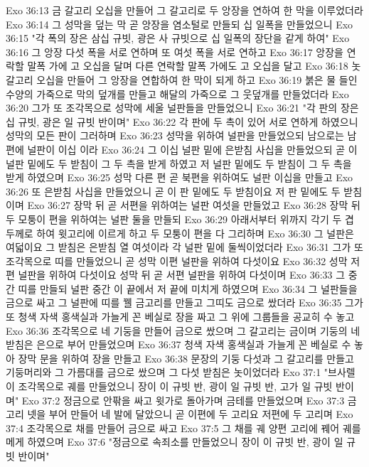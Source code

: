 Exo 36:13  금 갈고리 오십을 만들어 그 갈고리로 두 앙장을 연하여 한 막을 이루었더라
Exo 36:14  그 성막을 덮는 막 곧 앙장을 염소털로 만들되 십 일폭을 만들었으니
Exo 36:15  "각 폭의 장은 삼십 규빗, 광은 사 규빗으로 십 일폭의 장단을 같게 하여"
Exo 36:16  그 앙장 다섯 폭을 서로 연하며 또 여섯 폭을 서로 연하고
Exo 36:17  앙장을 연락할 말폭 가에 고 오십을 달며 다른 연락할 말폭 가에도 고 오십을 달고
Exo 36:18  놋 갈고리 오십을 만들어 그 앙장을 연합하여 한 막이 되게 하고
Exo 36:19  붉은 물 들인 수양의 가죽으로 막의 덮개를 만들고 해달의 가죽으로 그 웃덮개를 만들었더라
Exo 36:20  그가 또 조각목으로 성막에 세울 널판들을 만들었으니
Exo 36:21  "각 판의 장은 십 규빗, 광은 일 규빗 반이며"
Exo 36:22  각 판에 두 촉이 있어 서로 연하게 하였으니 성막의 모든 판이 그러하며
Exo 36:23  성막을 위하여 널판을 만들었으되 남으로는 남편에 널판이 이십 이라
Exo 36:24  그 이십 널판 밑에 은받침 사십을 만들었으되 곧 이 널판 밑에도 두 받침이 그 두 촉을 받게 하였고 저 널판 밑에도 두 받침이 그 두 촉을 받게 하였으며
Exo 36:25  성막 다른 편 곧 북편을 위하여도 널판 이십을 만들고
Exo 36:26  또 은받침 사십을 만들었으니 곧 이 판 밑에도 두 받침이요 저 판 밑에도 두 받침이며
Exo 36:27  장막 뒤 곧 서편을 위하여는 널판 여섯을 만들었고
Exo 36:28  장막 뒤 두 모퉁이 편을 위하여는 널판 둘을 만들되
Exo 36:29  아래서부터 위까지 각기 두 겹 두께로 하여 윗고리에 이르게 하고 두 모퉁이 편을 다 그리하며
Exo 36:30  그 널판은 여덟이요 그 받침은 은받침 열 여섯이라 각 널판 밑에 둘씩이었더라
Exo 36:31  그가 또 조각목으로 띠를 만들었으니 곧 성막 이편 널판을 위하여 다섯이요
Exo 36:32  성막 저편 널판을 위하여 다섯이요 성막 뒤 곧 서편 널판을 위하여 다섯이며
Exo 36:33  그 중간 띠를 만들되 널판 중간 이 끝에서 저 끝에 미치게 하였으며
Exo 36:34  그 널판들을 금으로 싸고 그 널판에 띠를 꿸 금고리를 만들고 그띠도 금으로 쌌더라
Exo 36:35  그가 또 청색 자색 홍색실과 가늘게 꼰 베실로 장을 짜고 그 위에 그룹들을 공교히 수 놓고
Exo 36:36  조각목으로 네 기둥을 만들어 금으로 쌌으며 그 갈고리는 금이며 기둥의 네 받침은 은으로 부어 만들었으며
Exo 36:37  청색 자색 홍색실과 가늘게 꼰 베실로 수 놓아 장막 문을 위하여 장을 만들고
Exo 36:38  문장의 기둥 다섯과 그 갈고리를 만들고 기둥머리와 그 가름대를 금으로 쌌으며 그 다섯 받침은 놋이었더라
Exo 37:1  "브사렐이 조각목으로 궤를 만들었으니 장이 이 규빗 반, 광이 일 규빗 반, 고가 일 규빗 반이며"
Exo 37:2  정금으로 안팎을 싸고 윗가로 돌아가며 금테를 만들었으며
Exo 37:3  금고리 넷을 부어 만들어 네 발에 달았으니 곧 이편에 두 고리요 저편에 두 고리며
Exo 37:4  조각목으로 채를 만들어 금으로 싸고
Exo 37:5  그 채를 궤 양편 고리에 꿰어 궤를 메게 하였으며
Exo 37:6  "정금으로 속죄소를 만들었으니 장이 이 규빗 반, 광이 일 규빗 반이며"
